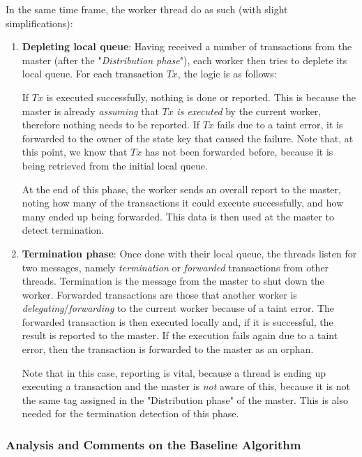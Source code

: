 In the same time frame, the worker thread do as such (with slight simplifications):

\begin{enumerate}
	\item \textbf{Depleting local queue}: Having received a number of transactions from the master
	(after the "\textit{Distribution phase}"), each worker then tries to deplete its local queue.
	For each transaction $Tx$, the logic is as follows:

	If $Tx$ is executed successfully, nothing is done or reported. This is because the master is
	already \textit{assuming} that $Tx$ \textit{is executed} by the current worker, therefore
	nothing needs to be reported. If $Tx$ fails due to a taint error, it is forwarded to the owner of
	the state key that caused the failure. Note that, at this point, we know that $Tx$ has not been
	forwarded before, because it is being retrieved from the initial local queue.

	At the end of this phase, the worker sends an overall report to the master, noting how many
	of the transactions it could execute successfully, and how many ended up being forwarded. This
	data is then used at the master to detect termination.

	\item \textbf{Termination phase}: Once done with their local queue, the threads listen for
	two messages, namely \textit{termination} or \textit{forwarded} transactions from other threads.
	Termination is the message from the master to shut down the worker. Forwarded transactions are
	those that another worker  is \textit{delegating}/\textit{forwarding} to the current
	worker because of a taint error. The forwarded transaction is then executed locally and, if it is
	successful, the result is reported to the master. If the execution fails again due to a taint
	error, then the transaction is forwarded to the master as an orphan.

	Note that in this case, reporting is vital, because a thread is ending up executing a
	transaction and the master is \textit{not} aware of this, because it is not the same tag
	assigned in the "Distribution phase" of the master. This is also needed for the termination
	detection of this phase.
\end{enumerate}

\subsubsection{Analysis and Comments on the Baseline Algorithm}

